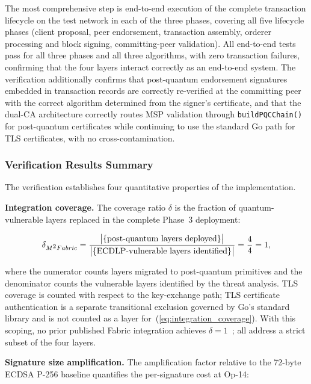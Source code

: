 \documentclass{ieeetj}
\newcommand{\mfabric}{M\textsuperscript{2}Fabric}
\begin{document}
The most comprehensive step is end-to-end execution of the complete transaction
lifecycle on the test network in each of the three phases, covering all five
lifecycle phases (client proposal, peer endorsement, transaction assembly,
orderer processing and block signing, committing-peer validation). All
end-to-end tests pass for all three phases and all three algorithms, with zero
transaction failures, confirming that the four layers interact correctly as an
end-to-end system. The verification additionally confirms that post-quantum
endorsement signatures embedded in transaction records are correctly re-verified
at the committing peer with the correct algorithm determined from the signer's
certificate, and that the dual-CA architecture correctly routes MSP validation
through \texttt{buildPQCChain()} for post-quantum certificates while continuing to
use the standard Go path for TLS certificates, with no cross-contamination.

\subsubsection{Verification Results Summary}
\label{sec:exp_verifysummary}

The verification establishes four quantitative properties of the implementation.

\textbf{Integration coverage.} The coverage ratio $\delta$ is the fraction of
quantum-vulnerable layers replaced in the complete Phase~3 deployment:

\begin{equation}
\delta_{\mfabric} =
\frac{\bigl|\{\text{post-quantum layers deployed}\}\bigr|}
{\bigl|\{\text{ECDLP-vulnerable layers identified}\}\bigr|}
= \frac{4}{4} = 1,
\label{eq:integration_coverage}
\end{equation}

where the numerator counts layers migrated to post-quantum primitives and the
denominator counts the vulnerable layers identified by the threat analysis. TLS
coverage is counted with respect to the key-exchange path; TLS certificate
authentication is a separate transitional exclusion governed by Go's standard
library and is not counted as a layer for~(\ref{eq:integration_coverage}). With
this scoping, no prior published Fabric integration achieves
$\delta=1$~\cite{holcomb2021, hu2025prototype, abbas2025}; all address a strict
subset of the four layers.

\textbf{Signature size amplification.} The amplification factor relative to the
72-byte ECDSA P-256 baseline quantifies the per-signature cost at Op-14:
\end{document}

